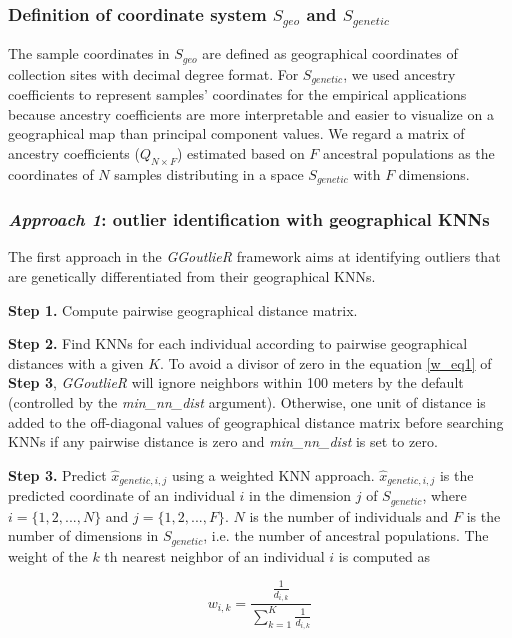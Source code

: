 \documentclass[11pt]{article}
\begin{document}
\subsubsection*{Definition of coordinate system $S_{geo}$ and $S_{genetic}$}

The sample coordinates in $S_{geo}$ are defined as geographical coordinates of collection sites with decimal degree format.
For $S_{genetic}$, we used ancestry coefficients \citep{pritchard2000inference} to represent samples' coordinates for the empirical applications because ancestry coefficients are more interpretable and easier to visualize on a geographical map than principal component values.
We regard a matrix of ancestry coefficients ($Q_{N\times F}$) estimated based on $F$ ancestral populations as the coordinates of $N$ samples distributing in a space $S_{genetic}$ with $F$ dimensions.

\subsubsection*{\textit{Approach 1}: outlier identification with geographical KNNs}

The first approach in the \textit{GGoutlieR} framework aims at identifying outliers that are genetically differentiated from their geographical KNNs.

\textbf{Step 1.} Compute pairwise geographical distance matrix.

\textbf{Step 2.} Find KNNs for each individual according to pairwise geographical distances with a given $K$.
To avoid a divisor of zero in the equation \ref{w_eq1} of \textbf{Step 3}, \textit{GGoutlieR} will ignore neighbors within 100 meters by the default (controlled by the \textit{min\_nn\_dist} argument).
Otherwise, one unit of distance is added to the off-diagonal values of geographical distance matrix before searching KNNs if any pairwise distance is zero and \textit{min\_nn\_dist} is set to zero.

\textbf{Step 3.} Predict $\hat{x}_{genetic,i,j}$ using a weighted KNN approach.
$\hat{x}_{genetic,i,j}$ is the predicted coordinate of an individual $i$ in the dimension $j$ of $S_{genetic}$, where $i = \{1,2,...,N\}$ and $j = \{1,2,...,F\}$. $N$ is the number of individuals and $F$ is the number of dimensions in $S_{genetic}$, i.e. the number of ancestral populations.
The weight of the $k$ th nearest neighbor of an individual $i$ is computed as

\begin{equation} \label{w_eq1}
w_{i,k}=\frac{\frac{1}{d_{i,k}}}{\sum_{k=1}^{K} \frac{1}{d_{i,k}}}
\end{equation}
\end{document}
